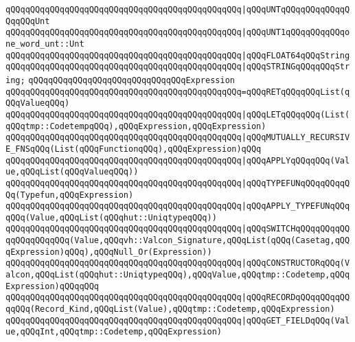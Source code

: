 \verb|qQQqqQQqqQQqqQQqqQQqqQQqqQQqqQQqqQQqqQQqqQQqqQQq|\verb#|qQQqUNTqQQqqQQqqQQqqQQqqQQqUnt#\newline
\verb|qQQqqQQqqQQqqQQqqQQqqQQqqQQqqQQqqQQqqQQqqQQqqQQq|\verb#|qQQqUNT1qQQqqQQqqQQqone_word_unt::Unt#\newline
\verb|qQQqqQQqqQQqqQQqqQQqqQQqqQQqqQQqqQQqqQQqqQQqqQQq|\verb#|qQQqFLOAT64qQQqString#\newline
\verb|qQQqqQQqqQQqqQQqqQQqqQQqqQQqqQQqqQQqqQQqqQQqqQQq|\verb#|qQQqSTRINGqQQqqQQqString;#\newline
\newline
\verb|qQQqqQQqqQQqqQQqqQQqqQQqqQQqqQQqExpression|\newline
\verb|qQQqqQQqqQQqqQQqqQQqqQQqqQQqqQQqqQQqqQQqqQQqqQQq=qQQqRETqQQqqQQqList(qQQqValueqQQq)|\newline
\verb|qQQqqQQqqQQqqQQqqQQqqQQqqQQqqQQqqQQqqQQqqQQqqQQq|\verb#|qQQqLETqQQqqQQq(List(qQQqtmp::CodetempqQQq),qQQqExpression,qQQqExpression)#\newline
\newline
\verb|qQQqqQQqqQQqqQQqqQQqqQQqqQQqqQQqqQQqqQQqqQQqqQQq|\verb#|qQQqMUTUALLY_RECURSIVE_FNSqQQq(List(qQQqFunctionqQQq),qQQqExpression)qQQq#\newline
\verb|qQQqqQQqqQQqqQQqqQQqqQQqqQQqqQQqqQQqqQQqqQQqqQQq|\verb#|qQQqAPPLYqQQqqQQq(Value,qQQqList(qQQqValueqQQq))#\newline
\newline
\verb|qQQqqQQqqQQqqQQqqQQqqQQqqQQqqQQqqQQqqQQqqQQqqQQq|\verb#|qQQqTYPEFUNqQQqqQQqqQQq(Typefun,qQQqExpression)#\newline
\verb|qQQqqQQqqQQqqQQqqQQqqQQqqQQqqQQqqQQqqQQqqQQqqQQq|\verb#|qQQqAPPLY_TYPEFUNqQQqqQQq(Value,qQQqList(qQQqhut::UniqtypeqQQq))#\newline
\newline
\verb|qQQqqQQqqQQqqQQqqQQqqQQqqQQqqQQqqQQqqQQqqQQqqQQq|\verb#|qQQqSWITCHqQQqqQQqqQQqqQQqqQQqqQQq(Value,qQQqvh::Valcon_Signature,qQQqList(qQQq(Casetag,qQQqExpression)qQQq),qQQqNull_Or(Expression))#\newline
\verb|qQQqqQQqqQQqqQQqqQQqqQQqqQQqqQQqqQQqqQQqqQQqqQQq|\verb#|qQQqCONSTRUCTORqQQq(Valcon,qQQqList(qQQqhut::UniqtypeqQQq),qQQqValue,qQQqtmp::Codetemp,qQQqExpression)qQQqqQQq#\newline
\newline
\verb|qQQqqQQqqQQqqQQqqQQqqQQqqQQqqQQqqQQqqQQqqQQqqQQq|\verb#|qQQqRECORDqQQqqQQqqQQqqQQq(Record_Kind,qQQqList(Value),qQQqtmp::Codetemp,qQQqExpression)#\newline
\verb|qQQqqQQqqQQqqQQqqQQqqQQqqQQqqQQqqQQqqQQqqQQqqQQq|\verb#|qQQqGET_FIELDqQQq(Value,qQQqInt,qQQqtmp::Codetemp,qQQqExpression)#\newline
